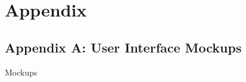 \chapter{Appendix}

\section{Appendix A: User Interface
Mockups}\label{appendix-a-user-interface-mockups}

Mockups
